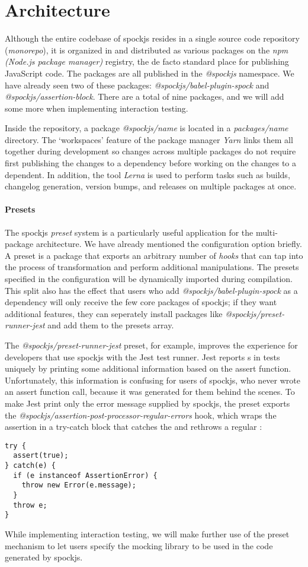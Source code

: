 \section{Architecture}
Although the entire codebase of spockjs resides in
a single source code repository (\textit{monorepo}),
it is organized in and distributed as various packages
on the \textit{npm (Node.js package manager)} registry,
\autocite{Npm}
the de facto standard place for publishing JavaScript code.
The packages are all published in the \textit{@spockjs} namespace.
We have already seen two of these packages:
\textit{@spockjs/babel-plugin-spock} and \textit{@spockjs/assertion-block}.
There are a total of nine packages,
and we will add some more when implementing interaction testing.

Inside the repository, a package \textit{@spockjs/name}
is located in a \textit{packages/name} directory.
The `workspaces' feature \autocite{YarnWorkspacesDoc}
of the package manager \textit{Yarn}
links them all together during development
so changes across multiple packages do not require
first publishing the changes to a dependency
before working on the changes to a dependent.
In addition, the tool \textit{Lerna} \autocite{LernaGithub} is used to
perform tasks such as builds, changelog generation, version bumps, and releases
on multiple packages at once.

\paragraph{Presets}
The spockjs \textit{preset} system is a particularly useful application
for the multi-package architecture.
We have already mentioned the  configuration option briefly.
A preset is a package that exports an arbitrary number of \textit{hooks}
that can tap into the process of transformation and perform additional manipulations.
The presets specified in the configuration will be dynamically imported during compilation.
This split also has the effect that users who add \textit{@spockjs/babel-plugin-spock}
as a dependency will only receive the few core packages of spockjs;
if they want additional features, they can seperately install packages like
\textit{@spockjs/preset-runner-jest} and add them to the presets array.

The \textit{@spockjs/preset-runner-jest} preset, for example, improves the experience
for developers that use spockjs with the Jest test runner.
Jest reports s in tests uniquely by printing
some additional information based on the assert function.
Unfortunately, this information is confusing for users of spockjs,
who never wrote an assert function call, because it was generated for them behind the scenes.
To make Jest print only the error message supplied by spockjs,
the preset exports the \textit{@spockjs/assertion-post-processor-regular-errors} hook,
which wraps the assertion in a try-catch block that catches the 
and rethrows a regular :
\begin{verbatim}
try {
  assert(true);
} catch(e) {
  if (e instanceof AssertionError) {
    throw new Error(e.message);
  }
  throw e;
}
\end{verbatim}

While implementing interaction testing,
we will make further use of the preset mechanism
to let users specify the mocking library to be used
in the code generated by spockjs.
